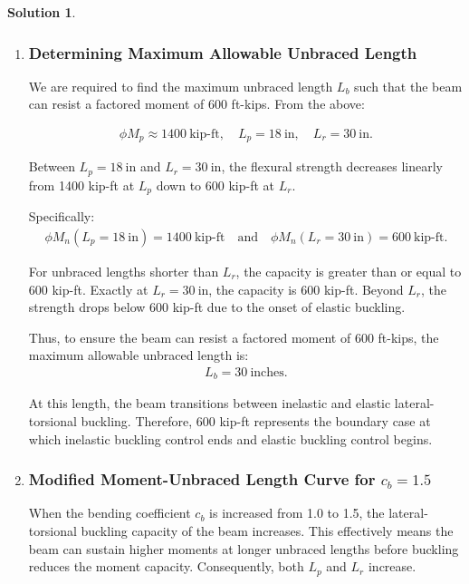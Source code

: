 \documentclass[12pt]{article}
\theoremstyle{definition} %
\newtheorem{solution}{Solution}
\theoremstyle{plain} %
\begin{document}
\begin{solution}
\begin{enumerate}
\begin{enumerate}
\end{enumerate}

\hrulefill


\item \subsubsection*{Determining Maximum Allowable Unbraced Length}

We are required to find the maximum unbraced length $ L_b $ such that the beam can resist a factored moment of 600 ft-kips. From the above: 

\begin{align}
\phi M_p \approx 1400~\text{kip-ft}, \quad L_p = 18~\text{in}, \quad L_r = 30~\text{in}.
\end{align}

Between $ L_p = 18~\text{in} $ and $ L_r = 30~\text{in} $, the flexural strength decreases linearly from 1400 kip-ft at $ L_p $ down to 600 kip-ft at $ L_r $.

Specifically:
\begin{align}
\phi M_n(L_p = 18~\text{in}) = 1400~\text{kip-ft} \quad \text{and} \quad \phi M_n(L_r = 30~\text{in}) = 600~\text{kip-ft}.
\end{align}

For unbraced lengths shorter than $ L_r $, the capacity is greater than or equal to 600 kip-ft. Exactly at $ L_r = 30~\text{in} $, the capacity is 600 kip-ft. Beyond $ L_r $, the strength drops below 600 kip-ft due to the onset of elastic buckling.

Thus, to ensure the beam can resist a factored moment of 600 ft-kips, the maximum allowable unbraced length is:
\begin{align}
\boxed{L_b = 30~\text{inches}}.
\end{align}

At this length, the beam transitions between inelastic and elastic lateral-torsional buckling. Therefore, 600 kip-ft represents the boundary case at which inelastic buckling control ends and elastic buckling control begins.

\hrulefill

\item \subsubsection*{Modified Moment-Unbraced Length Curve for $ c_b = 1.5 $}

When the bending coefficient $ c_b $ is increased from 1.0 to 1.5, the lateral-torsional buckling capacity of the beam increases. This effectively means the beam can sustain higher moments at longer unbraced lengths before buckling reduces the moment capacity. Consequently, both $ L_p $ and $ L_r $ increase.


\end{enumerate}
\end{solution}
\end{document}
